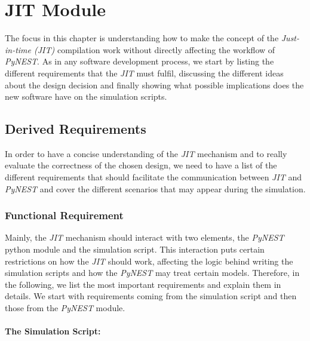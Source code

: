 
\chapter{JIT Module}
The focus in this chapter is understanding how to make the concept of the \emph{Just-in-time (JIT)} compilation work without directly affecting the workflow of \emph{PyNEST}. As in any software development process, we start by listing the different requirements that the \emph{JIT} must fulfil, discussing the different ideas about the design decision and finally showing what possible implications does the new software have on the simulation scripts.

 \label{chap:jit}
\section{Derived Requirements}
In order to have a concise understanding of the \emph{JIT} mechanism and to really evaluate the correctness of the chosen design, we need to have a list of the different requirements that should facilitate the communication between \emph{JIT} and \emph{PyNEST} and cover the different scenarios that may appear during the simulation. 
\subsection{Functional Requirement}



Mainly, the \emph{JIT} mechanism should interact with two elements, the \emph{PyNEST} python module and the simulation script. This interaction puts certain restrictions on how the \emph{JIT} should work, affecting the logic behind writing the simulation scripts and how the \emph{PyNEST} may treat certain models. Therefore, in the following, we list the most important requirements and explain them in details. We start with requirements coming from the simulation script and then those from the \emph{PyNEST} module.

\subsubsection*{The Simulation Script:}

